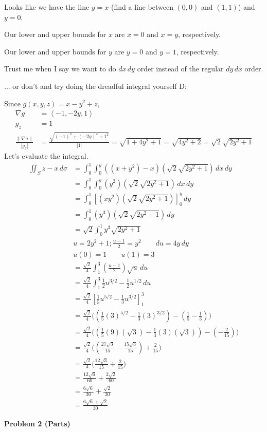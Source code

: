 \documentclass{article}
\newcommand{\lrp}[1]{\left( #1 \right)}
\newcommand{\lra}[1]{\left\langle #1 \right\rangle}
\newcommand{\lrb}[1]{\left[ #1 \right]}
\newcommand{\norm}[1]{\left\lVert #1 \right\rVert}
\begin{document}
Looks like we have the line $y=x$ (find a line between $(0,0)$ and $(1,1)$) and $y=0$.

Our lower and upper bounds for $x$ are $x=0$ and $x=y$, respectively.

Our lower and upper bounds for $y$ are $y=0$ and $y=1$, respectively.

Trust me when I say we want to do $dx\,dy$ order instead of the regular $dy\,dx$ order.

... or don't and try doing the dreadful integral yourself D:

Since $g(x,y,z)=x-y^2+z$,
\begin{align*}
    \nabla g&=\lra{-1,-2y,1}\\
    g_z&=1\\
    \frac{\norm{\nabla g}}{\left|g_z\right|}&=\frac{\sqrt{(-1)^2+(-2y)^2+1^2}}{\left|1\right|}=\sqrt{1+4y^2+1}=\sqrt{4y^2+2}=\sqrt{2}\sqrt{2y^2+1}
\end{align*}
Let's evaluate the integral.
\begin{align*}
    \iint_{S}z-x\,d\sigma &=\int_0^1\int_0^y \lrp{\lrp{x+y^2}-x}\lrp{\sqrt{2}\sqrt{2y^2+1}}\,dx\,dy\\
    &=\int_0^1\int_0^y\lrp{y^2}\lrp{\sqrt{2}\sqrt{2y^2+1}}\,dx\,dy\\
    &=\int_0^1 \lrb{\lrp{xy^2}\lrp{\sqrt{2}\sqrt{2y^2+1}}}_0^y\,dy\\
    &=\int_0^1 \lrp{y^3}\lrp{\sqrt{2}\sqrt{2y^2+1}}\,dy\\
    &=\sqrt{2}\int_0^1 y^3\sqrt{2y^2+1}\tag{we can take constants out}\\
    &u=2y^2+1; \frac{u-1}{2}=y^2\hspace{2em}du=4y\,dy\\
    &u(0)=1\hspace{2em}u(1)=3\\
    &=\frac{\sqrt{2}}{4}\int_1^3 \lrp{\frac{u-1}{2}}\sqrt{u}\,du\\
    &=\frac{\sqrt{2}}{4}\int_1^3 \frac{1}{2}u^{3/2}-\frac{1}{2}u^{1/2}\,du\\
    &=\frac{\sqrt{2}}{4}\lrb{\frac{1}{5}u^{5/2}-\frac{1}{3}u^{3/2}}_1^3\\
    &=\frac{\sqrt{2}}{4}\Bigg(\lrp{\frac{1}{5}(3)^{5/2}-\frac{1}{3}(3)^{3/2}}-\lrp{\frac{1}{5}-\frac{1}{3}}\Bigg)\\
    &=\frac{\sqrt{2}}{4}\Bigg(\lrp{\frac{1}{5}(9)(\sqrt{3})-\frac{1}{3}(3)(\sqrt{3})}-\lrp{-\frac{2}{15}}\Bigg)\\
    &=\frac{\sqrt{2}}{4}\Bigg(\lrp{\frac{27\sqrt{3}}{15}-\frac{15\sqrt{3}}{15}}+\frac{2}{15}\Bigg)\\
    &=\frac{\sqrt{2}}{4}\Bigg(\frac{12\sqrt{3}}{15}+\frac{2}{15}\Bigg)\\
    &=\frac{12\sqrt{6}}{60}+\frac{2\sqrt{2}}{60}\\
    &=\frac{6\sqrt{6}}{30}+\frac{\sqrt{2}}{30}\\
    &=\boxed{\frac{6\sqrt{6}+\sqrt{2}}{30}}
\end{align*}
{}\textbf{Problem 2 (Parts)}
\end{document}
